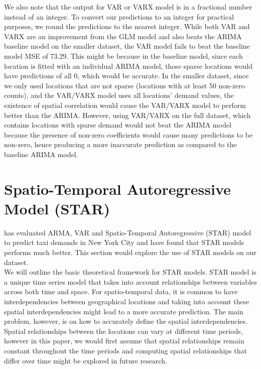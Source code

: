 \documentclass[nonblindrev,msom]{informs3} %
\begin{document}
We also note that the output for VAR or VARX model is in a fractional number instead of an integer. To convert our predictions to an integer for practical purposes, we round the predictions to the nearest integer. While both VAR and VARX are an improvement from the GLM model and also beats the ARIMA baseline model on the smaller dataset, the VAR model fails to beat the baseline model MSE of 73.29. This might be because in the baseline model, since each location is fitted with an individual ARIMA model, those sparse locations would have predictions of all 0, which would be accurate. In the smaller dataset, since we only used locations that are not sparse (locations with at least 50 non-zero counts), and the VAR/VARX model uses all locations' demand values, the existence of spatial correlation would cause the VAR/VARX model to perform better than the ARIMA. However, using VAR/VARX on the full dataset, which contains locations with sparse demand would not beat the ARIMA model because the presence of non-zero coefficients would cause many predictions to be non-zero, hence producing a more inaccurate prediction as compared to the baseline ARIMA model. \\


\newpage

\section{Spatio-Temporal Autoregressive Model (STAR)}

\cite{Abolfazl2017} has evaluated ARMA, VAR and Spatio-Temporal Autoregressive (STAR) model to predict taxi demands in New York City and have found that STAR models performs much better. This section would explore the use of STAR models on our dataset. \\

\noindent We will outline the basic theoretical framework for STAR models. STAR model is a unique time series model that takes into account relationships between variables across both time and space. For spatio-temporal data, it is common to have interdependencies between geographical locations and taking into account these spatial interdependencies might lead to a more accurate prediction. The main problem, however, is on how to accurately define the spatial interdependencies. Spatial relationships between the locations can vary at different time periods, however in this paper, we would first assume that spatial relationships remain constant throughout the time periods and computing spatial relationships that differ over time might be explored in future research. \\
\end{document}
